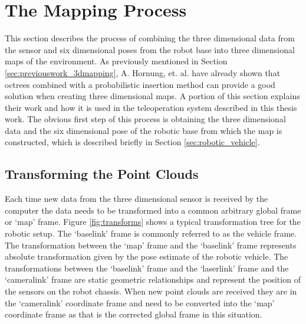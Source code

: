 \documentclass[12pt]{report}
\begin{document}
\section{The Mapping Process}
\label{sec:3dmapping}
This section describes the process of combining the three dimensional data from the sensor and six dimensional poses from the robot base into three dimensional maps of the environment. As previously mentioned in Section \ref{sec:previouswork_3dmapping}, A. Hornung, et. al. have already shown that octrees combined with a probabilistic insertion method can provide a good solution when creating three dimensional maps. A portion of this section explains their work\cite{octomap} and how it is used in the teleoperation system described in this thesis work. The obvious first step of this process is obtaining the three dimensional data and the six dimensional pose of the robotic base from which the map is constructed, which is described briefly in Section \ref{sec:robotic_vehicle}.

\subsection{Transforming the Point Clouds}
Each time new data from the three dimensional sensor is received by the computer the data needs to be transformed into a common arbitrary global frame or `map' frame. Figure \ref{fig:transforms} shows a typical transformation tree for the robotic setup. The `base\textunderscore{}link' frame is commonly referred to as the vehicle frame. The transformation between the `map' frame and the `base\textunderscore{}link' frame represents absolute transformation given by the pose estimate of the robotic vehicle. The transformations between the `base\textunderscore{}link' frame and the `laser\textunderscore{}link' frame and the `camera\textunderscore{}link' frame are static geometric relationships and represent the position of the sensors on the robot chassis. When new point clouds are received they are in the `camera\textunderscore{}link' coordinate frame and need to be converted into the `map' coordinate frame as that is the corrected global frame in this situation.
\end{document}
